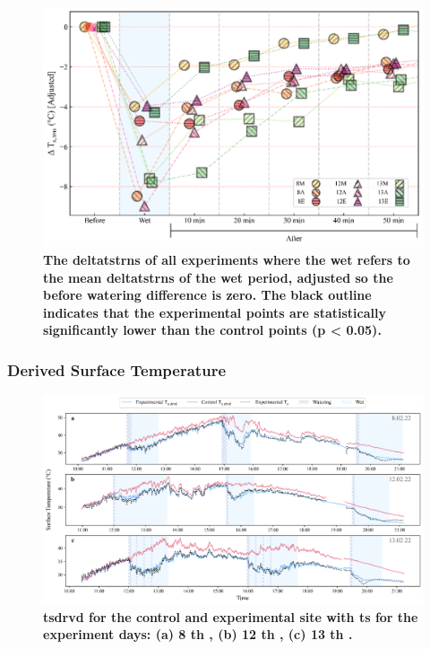 \documentclass[final,3p,times,authoryear]{elsarticle}
\begin{document}
{\begin{figure}
\centering
\includegraphics[trim={0 0 0 0},clip,scale=1.0]{pict045.png}
\caption{\bf The \gls{deltatstrns} of all experiments where the wet refers to the mean \gls{deltatstrns} of the wet period,
adjusted so the before watering difference is zero. The black outline indicates that the experimental points
are statistically significantly lower than the control points (p < 0.05).}
 \label{fig:7.16}
\end{figure}

\subsubsection{Derived Surface Temperature}\label{sec:appendix7.5.10}

\begin{figure}
\centering
\includegraphics[trim={0 0 0 0},clip,scale=1.0]{pict028.png}
\caption{\bf \gls{tsdrvd} for the control and experimental site with \gls{ts} for the experiment days: (a) 8 th , (b) 12 th ,
(c) 13 th .}
 \label{fig:7.17}
\end{figure}


}
\end{document}
